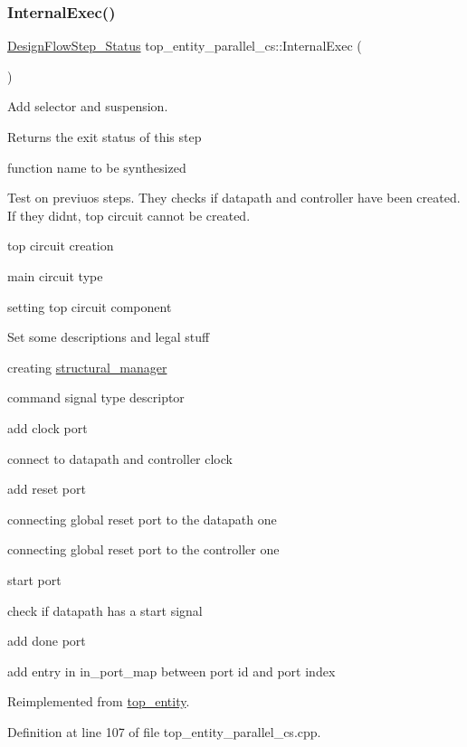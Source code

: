 \subsubsection{\texorpdfstring{Internal\+Exec()}{InternalExec()}}
{\footnotesize\ttfamily \hyperlink{design__flow__step_8hpp_afb1f0d73069c26076b8d31dbc8ebecdf}{Design\+Flow\+Step\+\_\+\+Status} top\+\_\+entity\+\_\+parallel\+\_\+cs\+::\+Internal\+Exec (\begin{DoxyParamCaption}{ }\end{DoxyParamCaption})\hspace{0.3cm}{\ttfamily [virtual]}}



Add selector and suspension. 

\begin{DoxyReturn}{Returns}
the exit status of this step 
\end{DoxyReturn}
function name to be synthesized

Test on previuos steps. They checks if datapath and controller have been created. If they didn\textquotesingle{}t, top circuit cannot be created.

top circuit creation

main circuit type

setting top circuit component

Set some descriptions and legal stuff

creating \hyperlink{classstructural__manager}{structural\+\_\+manager}

command signal type descriptor

add clock port

connect to datapath and controller clock

add reset port

connecting global reset port to the datapath one

connecting global reset port to the controller one

start port

check if datapath has a start signal

add done port

add entry in in\+\_\+port\+\_\+map between port id and port index 

Reimplemented from \hyperlink{classtop__entity_ae3b1c2be3024a1f3abfe3066d8db12fb}{top\+\_\+entity}.



Definition at line 107 of file top\+\_\+entity\+\_\+parallel\+\_\+cs.\+cpp.



